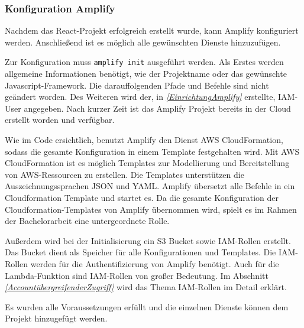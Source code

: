 \subsubsection{Konfiguration Amplify}

Nachdem das React-Projekt erfolgreich erstellt wurde, kann Amplify konfiguriert werden.
Anschließend ist es möglich alle gewünschten Dienste hinzuzufügen.

Zur Konfiguration muss \verb+amplify init+ ausgeführt werden.
Als Erstes werden allgemeine Informationen benötigt, wie der Projektname oder das gewünschte Javascript-Framework.
Die darauffolgenden Pfade und Befehle sind nicht geändert worden.
Des Weiteren wird der, in \textit{\ref{EinrichtungAmplify} } erstellte, IAM-User angegeben.
Nach kurzer Zeit ist das Amplify Projekt bereits in der Cloud erstellt worden und verfügbar.

Wie im Code ersichtlich, benutzt Amplify den Dienst AWS CloudFormation, sodass die gesamte Konfiguration in einem Template festgehalten wird.
Mit AWS CloudFormation ist es möglich Templates zur Modellierung und Bereitstellung von AWS-Ressourcen zu erstellen.
Die Templates unterstützen die Auszeichnungssprachen JSON und YAML.
Amplify übersetzt alle Befehle in ein Cloudformation Template und startet es.
Da die gesamte Konfiguration der Cloudformation-Templates von Amplify übernommen wird, spielt es im Rahmen der Bachelorarbeit eine untergeordnete Rolle.

Außerdem wird bei der Initialisierung ein S3 Bucket sowie IAM-Rollen erstellt.
Das Bucket dient als Speicher für alle Konfigurationen und Templates.
Die IAM-Rollen werden für die Authentifizierung von Amplify benötigt.
Auch für die Lambda-Funktion sind IAM-Rollen von großer Bedeutung.
Im Abschnitt \textit{\ref{AccountübergreifenderZugriff} } wird das Thema IAM-Rollen im Detail erklärt.

Es wurden alle Voraussetzungen erfüllt und die einzelnen Dienste können dem Projekt hinzugefügt werden.

\clearpage

